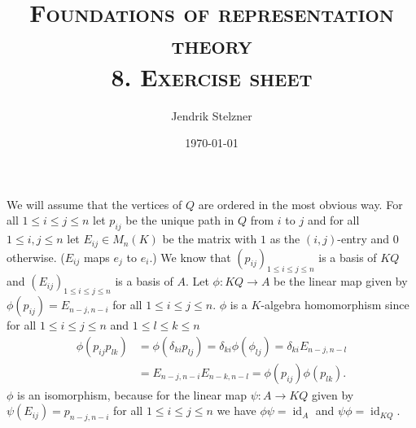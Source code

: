 \documentclass[a4paper,10pt]{article}
\title{\textsc{Foundations of representation theory \\ \Large 8. Exercise sheet}}
\author{Jendrik Stelzner}
\date{\today}
\theoremstyle{definition}
\newcommand{\id}{\operatorname{id}}
\begin{document}
\maketitle





\section{}
We will assume that the vertices of $Q$ are ordered in the most obvious way. For all $1 \leq i \leq j \leq n$  let $p_{ij}$ be the unique path in $Q$ from $i$ to $j$ and for all $1 \leq i, j \leq n$ let $E_{ij} \in M_n(K)$ be the matrix with $1$ as the $(i,j)$-entry and $0$ otherwise. ($E_{ij}$ maps $e_j$ to $e_i$.) We know that $(p_{ij})_{1 \leq i \leq j \leq n}$ is a basis of $KQ$ and $(E_{ij})_{1 \leq i \leq j \leq n}$ is a basis of $A$. Let $\phi : KQ \rightarrow A$ be the linear map given by $\phi(p_{ij}) = E_{n-j,n-i}$ for all $1 \leq i \leq j \leq n$. $\phi$ is a $K$-algebra homomorphism since for all $1 \leq i \leq j \leq n$ and $1 \leq l \leq k \leq n$
\begin{align*}
 \phi(p_{ij} p_{lk})
 &= \phi(\delta_{ki} p_{lj})
 = \delta_{ki} \phi(\phi_{lj})
 = \delta_{ki} E_{n-j, n-l} \\
 &= E_{n-j, n-i} E_{n-k, n-l}
 = \phi(p_{ij}) \phi(p_{lk}).
\end{align*}
$\phi$ is an isomorphism, because for the linear map $\psi: A \rightarrow KQ$ given by $\psi(E_{ij}) = p_{n-j,n-i}$ for all $1 \leq i \leq j \leq n$ we have $\phi \psi = \id_A$ and $\psi \phi = \id_{KQ}$.
\end{document}
